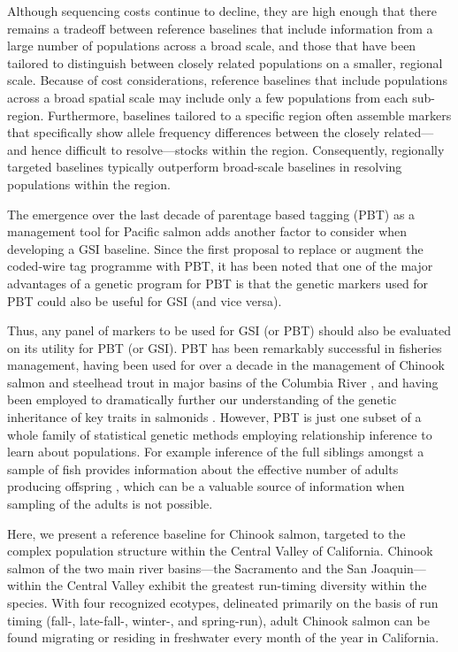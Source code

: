 Although sequencing costs continue to decline, they are high enough
that there remains a tradeoff
between reference baselines that include information from a large number of
populations across a broad scale, and those that have been tailored
to distinguish between closely related populations on a smaller, regional scale.
Because of cost considerations, reference baselines that include populations across a broad 
spatial scale may include only a few populations from each sub-region.  Furthermore,
baselines tailored to a specific region often assemble markers that specifically
show allele frequency differences between the closely related---and hence difficult
to resolve---stocks within the region.  Consequently, regionally targeted baselines typically
outperform broad-scale baselines in resolving populations within the region.

The emergence over the last decade of parentage based tagging (PBT) as a management
tool for Pacific salmon adds another factor to consider when developing a GSI baseline.
Since the first proposal \citep{anderson2005description} to replace or augment the coded-wire tag
programme \citep{nandor2010overview}
with PBT, it has been noted that one of the major advantages of a genetic program for
PBT is that the genetic markers used for PBT could also be useful for GSI (and
vice versa).  

Thus, any panel of markers to be used for GSI (or PBT) should also be evaluated on its
utility for PBT (or GSI).  PBT has been remarkably successful in fisheries
management, having been used for over a decade in the management of Chinook salmon
and steelhead trout in major basins of the Columbia River \cite{steele2019parentage,horn2023multigeneration}, and having been employed to dramatically further our
understanding of the genetic inheritance of key traits in salmonids
\citep{abadia2013large,beulke2023distinct}. However, PBT is just one subset of a whole
family of statistical genetic methods employing relationship inference to learn about
populations.  For example inference of the full siblings amongst a sample of fish
provides information about the effective number of adults producing offspring
\citep{waples2011inbreeding,wang2023estimating}, which can
be a valuable source of information when sampling of the adults is not possible.  


Here, we present a reference baseline for Chinook salmon, targeted to the complex population 
structure within the Central Valley of California. Chinook salmon of the two main river basins---the 
Sacramento and the San Joaquin---within the Central Valley exhibit the greatest run-timing diversity
within the species.  With four recognized ecotypes, delineated primarily on the basis of run timing
(fall-, late-fall-, winter-, and spring-run), adult Chinook salmon can be found migrating or residing
in freshwater every month of the year in California. 

